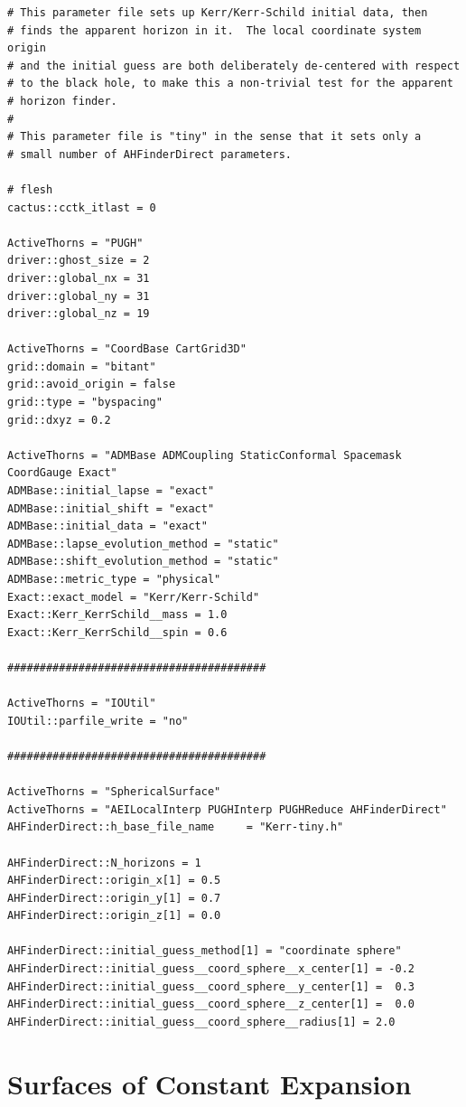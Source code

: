 \begin{verbatim}
# This parameter file sets up Kerr/Kerr-Schild initial data, then
# finds the apparent horizon in it.  The local coordinate system origin
# and the initial guess are both deliberately de-centered with respect
# to the black hole, to make this a non-trivial test for the apparent
# horizon finder.
#
# This parameter file is "tiny" in the sense that it sets only a
# small number of AHFinderDirect parameters.

# flesh
cactus::cctk_itlast = 0

ActiveThorns = "PUGH"
driver::ghost_size = 2
driver::global_nx = 31
driver::global_ny = 31
driver::global_nz = 19

ActiveThorns = "CoordBase CartGrid3D"
grid::domain = "bitant"
grid::avoid_origin = false
grid::type = "byspacing"
grid::dxyz = 0.2

ActiveThorns = "ADMBase ADMCoupling StaticConformal Spacemask CoordGauge Exact"
ADMBase::initial_lapse = "exact"
ADMBase::initial_shift = "exact"
ADMBase::initial_data = "exact"
ADMBase::lapse_evolution_method = "static"
ADMBase::shift_evolution_method = "static"
ADMBase::metric_type = "physical"
Exact::exact_model = "Kerr/Kerr-Schild"
Exact::Kerr_KerrSchild__mass = 1.0
Exact::Kerr_KerrSchild__spin = 0.6

########################################

ActiveThorns = "IOUtil"
IOUtil::parfile_write = "no"

########################################

ActiveThorns = "SphericalSurface"
ActiveThorns = "AEILocalInterp PUGHInterp PUGHReduce AHFinderDirect"
AHFinderDirect::h_base_file_name     = "Kerr-tiny.h"

AHFinderDirect::N_horizons = 1
AHFinderDirect::origin_x[1] = 0.5
AHFinderDirect::origin_y[1] = 0.7
AHFinderDirect::origin_z[1] = 0.0

AHFinderDirect::initial_guess_method[1] = "coordinate sphere"
AHFinderDirect::initial_guess__coord_sphere__x_center[1] = -0.2
AHFinderDirect::initial_guess__coord_sphere__y_center[1] =  0.3
AHFinderDirect::initial_guess__coord_sphere__z_center[1] =  0.0
AHFinderDirect::initial_guess__coord_sphere__radius[1] = 2.0
\end{verbatim}


\section{Surfaces of Constant Expansion}

